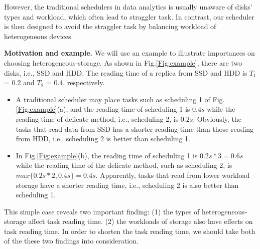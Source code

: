 \documentclass[conference]{IEEEtran}
\begin{document}
However, the traditional schedulers in data analytics is usually unaware of disks' types and workload, which often lead to straggler task. In contrast, our scheduler is then designed to avoid the straggler task by balancing workload of heterogeneous devices.

\textbf{Motivation and example.}
We will use an example to illustrate importances on choosing heterogeneous-storage. As shown in Fig.\ref{Fig:example}, there are two disks, i.e., SSD and HDD. The reading time of a replica from SSD and HDD is $T_1$ = 0.2 and $T_2$ = 0.4, respectively. 
\begin{itemize}
	\item A traditional scheduler may place tasks such as scheduling 1 of Fig.\ref{Fig:example}(a), and the reading time of scheduling 1 is $0.4s$ while the reading time of delicate method, i.e., scheduling 2, is $0.2s$. Obviously, the tasks that read data from SSD has a shorter reading time than those reading from HDD, i.e., scheduling 2 is better than scheduling 1. 
	\item In Fig.\ref{Fig:example}(b), the reading time of scheduling 1 is $0.2s * 3 = 0.6s$ while the reading time of the delicate method, such as scheduling 2, is $max\{0.2s * 2, 0.4s\} = 0.4s$. Apparently, tasks that read from lower workload storage have a shorter reading time, i.e., scheduling 2 is also better than scheduling 1.
\end{itemize}

This simple case reveals two important finding: (1) the types of heterogeneous-storage affect task reading time. (2) the workloads of storage also have effects on task reading time. In order to shorten the task reading time, we should take both of the these two findings into consideration.

\end{document}
